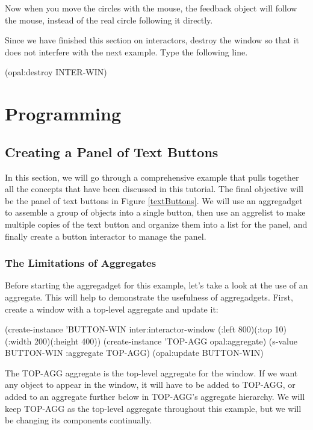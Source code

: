 Now when you move the circles with the mouse, the feedback object will
follow the mouse, instead of the real circle following it directly.

Since we have finished this section on interactors, destroy the window
so that it does not interfere with the next example.  Type the
following line.

\begin{programexample}
(opal:destroy INTER-WIN)
\end{programexample}


\chapter{Programming}

\section{Creating a Panel of Text Buttons}
\label{big-example}

In this section, we will go through a comprehensive example that pulls
together all the concepts that have been discussed in this tutorial.
The final objective will be the panel of text buttons in Figure
\ref{textButtons}.  We will use an aggregadget to assemble a group
of objects into a single button, then use an aggrelist to make
multiple copies of the text button and organize them into a list for
the panel, and finally create a button interactor to manage the panel.


\subsection{The Limitations of Aggregates}

Before starting the aggregadget for this example, let's take a look at the use
of an aggregate.  This will help to demonstrate the usefulness of
aggregadgets.  First, create a window with a top-level aggregate and
update it:

\begin{programexample}
(create-instance 'BUTTON-WIN inter:interactor-window
   (:left 800)(:top 10)(:width 200)(:height 400))
(create-instance 'TOP-AGG opal:aggregate)
(s-value BUTTON-WIN :aggregate TOP-AGG)
(opal:update BUTTON-WIN)
\end{programexample}

The TOP-AGG aggregate is the top-level aggregate for the window.  If
we want any object to appear in the window, it will have to be added
to TOP-AGG, or added to an aggregate further below in TOP-AGG's
aggregate hierarchy.  We will keep TOP-AGG as the top-level aggregate
throughout this example, but we will be changing its components continually.

